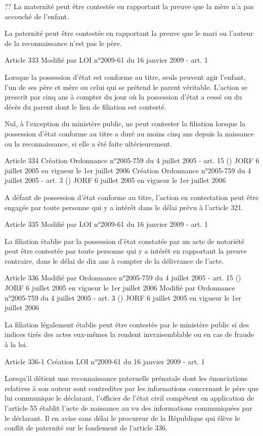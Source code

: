 \documentclass[
  12pt,
]{book}
\begin{document}
\begin{encadre}{??}
La maternité peut être contestée en rapportant la preuve que la mère n'a pas accouché de l'enfant.

La paternité peut être contestée en rapportant la preuve que le mari ou l'auteur de la reconnaissance n'est pas le père.

Article 333
Modifié par LOI n°2009-61 du 16 janvier 2009 - art. 1

Lorsque la possession d'état est conforme au titre, seuls peuvent agir l'enfant, l'un de ses père et mère ou celui qui se prétend le parent véritable. L'action se prescrit par cinq ans à compter du jour où la possession d'état a cessé ou du décès du parent dont le lien de filiation est contesté.

Nul, à l'exception du ministère public, ne peut contester la filiation lorsque la possession d'état conforme au titre a duré au moins cinq ans depuis la naissance ou la reconnaissance, si elle a été faite ultérieurement.

Article 334
Création Ordonnance n°2005-759 du 4 juillet 2005 - art. 15 () JORF 6 juillet 2005 en vigueur le 1er juillet 2006
Création Ordonnance n°2005-759 du 4 juillet 2005 - art. 3 () JORF 6 juillet 2005 en vigueur le 1er juillet 2006

A défaut de possession d'état conforme au titre, l'action en contestation peut être engagée par toute personne qui y a intérêt dans le délai prévu à l'article 321.

Article 335
Modifié par LOI n°2009-61 du 16 janvier 2009 - art. 1

La filiation établie par la possession d'état constatée par un acte de notoriété peut être contestée par toute personne qui y a intérêt en rapportant la preuve contraire, dans le délai de dix ans à compter de la délivrance de l'acte.

Article 336
Modifié par Ordonnance n°2005-759 du 4 juillet 2005 - art. 15 () JORF 6 juillet 2005 en vigueur le 1er juillet 2006
Modifié par Ordonnance n°2005-759 du 4 juillet 2005 - art. 3 () JORF 6 juillet 2005 en vigueur le 1er juillet 2006

La filiation légalement établie peut être contestée par le ministère public si des indices tirés des actes eux-mêmes la rendent invraisemblable ou en cas de fraude à la loi.

Article 336-1
Création LOI n°2009-61 du 16 janvier 2009 - art. 1

Lorsqu'il détient une reconnaissance paternelle prénatale dont les énonciations relatives à son auteur sont contredites par les informations concernant le père que lui communique le déclarant, l'officier de l'état civil compétent en application de l'article 55 établit l'acte de naissance au vu des informations communiquées par le déclarant. Il en avise sans délai le procureur de la République qui élève le conflit de paternité sur le fondement de l'article 336.


\end{encadre}
\end{document}
